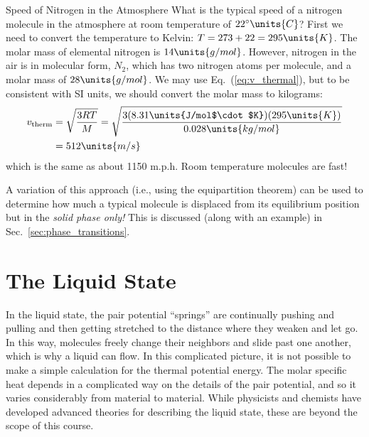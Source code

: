 
\begin{example}{Speed of Nitrogen in the Atmosphere}
What is the typical speed of a nitrogen molecule in the atmosphere at 
room temperature of $22^\circ\units{C}$?
\solution
First we need to convert the temperature to Kelvin:
$T = 273 + 22 = 295\units{K}$.
The molar mass of elemental nitrogen is $14\units{g/mol}$.  However,
nitrogen in the air is in molecular form, $N_2$, which has two nitrogen
atoms per molecule, and a molar mass of $28\units{g/mol}$.  We
may use Eq.~(\ref{eq:v_thermal}), but to be consistent with SI units,
we should convert the molar mass to kilograms:
\begin{align}
v_\text{therm} &= \sqrt{\frac{3 R T}{M}} = \sqrt{
 \frac{3(8.31\units{J/mol$\cdot$K})(295\units{K})}{0.028\units{kg/mol}}}
\nonumber\\
&= 512\units{m/s}
\end{align}
which is the same as about 1150 m.p.h.  Room temperature molecules are fast!
\label{example:vtherm}
\end{example}

A variation of this approach (i.e., using the equipartition theorem)
can be used to determine
how much a typical molecule is displaced from its
equilibrium position but in the {\em solid phase only!}  This is discussed
(along with an example) in Sec.~\ref{sec:phase_transitions}.


\section{The Liquid State}

In the liquid state, the pair potential ``springs'' are continually
pushing and pulling and then getting stretched to the distance where
they weaken and let go.  In this way, molecules freely change their
neighbors and slide past one another, which is why a liquid can flow.
In this complicated picture, it is not possible to make a simple
calculation for the thermal potential energy.  The molar specific heat
depends in a complicated way on the details of the pair potential, and
so it varies considerably from material to material.    While physicists
and chemists have developed advanced theories for describing the
liquid state, these are beyond the scope of this course.

